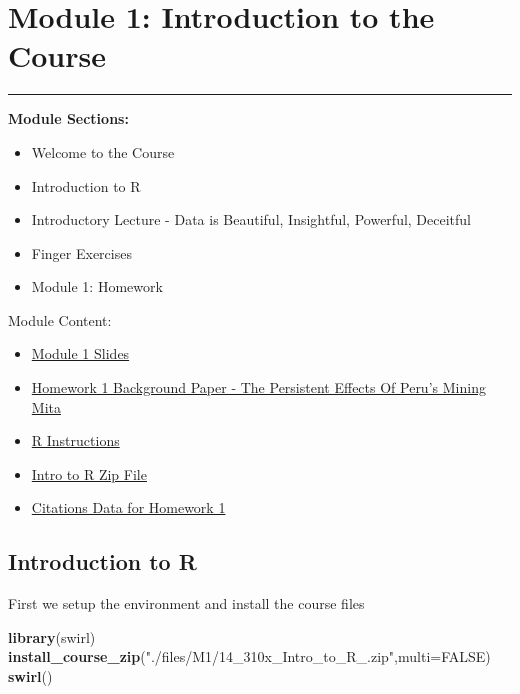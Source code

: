 \documentclass[]{book}
\newenvironment{Shaded}{\begin{snugshade}}{\end{snugshade}}
\newcommand{\KeywordTok}[1]{\textcolor[rgb]{0.13,0.29,0.53}{\textbf{#1}}}
\newcommand{\DataTypeTok}[1]{\textcolor[rgb]{0.13,0.29,0.53}{#1}}
\newcommand{\StringTok}[1]{\textcolor[rgb]{0.31,0.60,0.02}{#1}}
\newcommand{\OtherTok}[1]{\textcolor[rgb]{0.56,0.35,0.01}{#1}}
\newcommand{\NormalTok}[1]{#1}
\providecommand{\tightlist}{%
  \setlength{\itemsep}{0pt}\setlength{\parskip}{0pt}}
\theoremstyle{definition}
\theoremstyle{definition}
\theoremstyle{definition}
\theoremstyle{remark}
\begin{document}
\chapter{Module 1: Introduction to the
Course}\label{module-1-introduction-to-the-course}

\begin{center}\rule{0.5\linewidth}{\linethickness}\end{center}

\textbf{Module Sections:}

\begin{itemize}
\tightlist
\item
  Welcome to the Course
\item
  Introduction to R
\item
  Introductory Lecture - Data is Beautiful, Insightful, Powerful,
  Deceitful
\item
  Finger Exercises
\item
  Module 1: Homework
\end{itemize}

Module Content:

\begin{itemize}
\tightlist
\item
  \href{./files/M1/Lecture_Slides_01.pdf}{Module 1 Slides}
\item
  \href{./files/M1/M1Paper.pdf}{Homework 1 Background Paper - The
  Persistent Effects Of Peru's Mining Mita}
\item
  \href{./files/M1/R_Instructions.pdf}{R Instructions}\\
\item
  \href{./files/M1/14_310x_Intro_to_R_.zip.pdf}{Intro to R Zip File}\\
\item
  \href{\%22./files/CitesforSara.csv\%22}{Citations Data for Homework 1}
\end{itemize}

\section{Introduction to R}\label{introduction-to-r}

First we setup the environment and install the course files

\begin{Shaded}
\begin{Highlighting}[]
\KeywordTok{library}\NormalTok{(swirl)}
\KeywordTok{install_course_zip}\NormalTok{(}\StringTok{"./files/M1/14_310x_Intro_to_R_.zip"}\NormalTok{,}\DataTypeTok{multi=}\OtherTok{FALSE}\NormalTok{)}
\KeywordTok{swirl}\NormalTok{()}
\end{Highlighting}
\end{Shaded}
\end{document}
